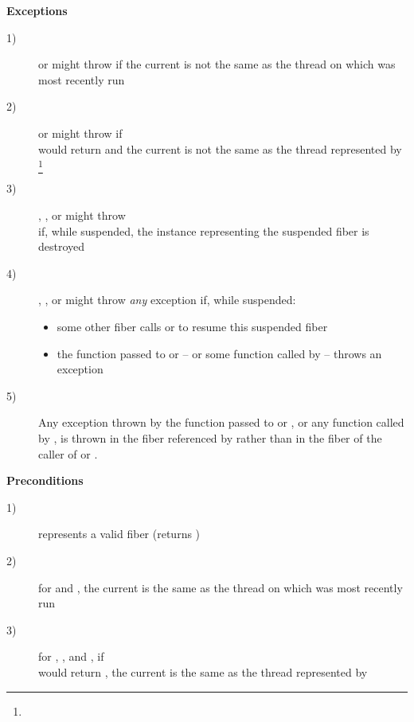 {\bfseries Exceptions}
\begin{description}
    \item[1)] \resume or \resumewith might throw  if
              the current \thread is not the same as the thread on
              which  was most recently run
    \item[2)] \xtresume or \xtresumewith might throw  if\\
              \canxtresume would return  and the current \thread
              is not the same as the thread represented
              by \footnote{}
    \item[3)] \resume, \resumewith, \xtresume or \xtresumewith might throw\\
              \unwindex if, while suspended, the \fiber instance representing
              the suspended fiber is destroyed
    \item[4)] \resume, \resumewith, \xtresume or \xtresumewith might
              throw \emph{any} exception if, while suspended:
              \begin{itemize}
                  \item some other fiber calls \resumewith or \xtresumewith to
                        resume this suspended fiber
                  \item the function  passed to \resumewith
                        or \xtresumewith -- or some function called
                        by  -- throws an exception
              \end{itemize}
    \item[5)] Any exception thrown by the function  passed
              to \resumewith or \xtresumewith, or any function called
              by , is thrown in the fiber referenced by 
              rather than in the fiber of the caller of \resumewith
              or \xtresumewith.
\end{description}

{\bfseries Preconditions}
\begin{description}
    \item[1)]  represents a valid fiber (\opbool returns )
    \item[2)] for \resume and \resumewith, the current \thread is the same as
              the thread on which  was most recently run
    \item[3)] for \resume, \resumewith, \xtresume and \xtresumewith, if\\
              \canxtresume would return , the current \thread is
              the same as the thread represented by 
\end{description}

